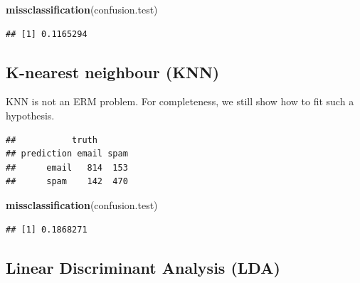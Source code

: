 \documentclass[]{book}
\newenvironment{Shaded}{\begin{snugshade}}{\end{snugshade}}
\newcommand{\KeywordTok}[1]{\textcolor[rgb]{0.13,0.29,0.53}{\textbf{{#1}}}}
\newcommand{\DataTypeTok}[1]{\textcolor[rgb]{0.13,0.29,0.53}{{#1}}}
\newcommand{\DecValTok}[1]{\textcolor[rgb]{0.00,0.00,0.81}{{#1}}}
\newcommand{\FloatTok}[1]{\textcolor[rgb]{0.00,0.00,0.81}{{#1}}}
\newcommand{\StringTok}[1]{\textcolor[rgb]{0.31,0.60,0.02}{{#1}}}
\newcommand{\CommentTok}[1]{\textcolor[rgb]{0.56,0.35,0.01}{\textit{{#1}}}}
\newcommand{\NormalTok}[1]{{#1}}
\theoremstyle{definition}
\theoremstyle{definition}
\theoremstyle{remark}
\begin{document}
\begin{Shaded}
\begin{Highlighting}[]
\KeywordTok{missclassification}\NormalTok{(confusion.test)}
\end{Highlighting}
\end{Shaded}

\begin{verbatim}
## [1] 0.1165294
\end{verbatim}

\subsection{K-nearest neighbour (KNN)}\label{k-nearest-neighbour-knn}

KNN is not an ERM problem. For completeness, we still show how to fit
such a hypothesis.

\begin{Shaded}
\end{Shaded}

\begin{verbatim}
##           truth
## prediction email spam
##      email   814  153
##      spam    142  470
\end{verbatim}

\begin{Shaded}
\begin{Highlighting}[]
\KeywordTok{missclassification}\NormalTok{(confusion.test)}
\end{Highlighting}
\end{Shaded}

\begin{verbatim}
## [1] 0.1868271
\end{verbatim}

\subsection{Linear Discriminant Analysis
(LDA)}\label{linear-discriminant-analysis-lda}
\end{document}
